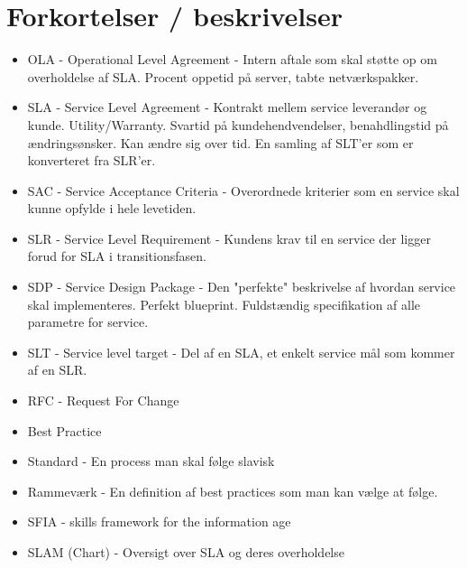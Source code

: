 \section{Forkortelser / beskrivelser}
\begin{itemize}
\item OLA - Operational Level Agreement - Intern aftale som skal støtte op om overholdelse af SLA. Procent oppetid på server, tabte netværkspakker.
\item SLA - Service Level Agreement - Kontrakt mellem service leverandør og kunde. Utility/Warranty. Svartid på kundehendvendelser, benahdlingstid på ændringsønsker. Kan ændre sig over tid. En samling af SLT'er som er konverteret fra SLR'er.
\item SAC - Service Acceptance Criteria - Overordnede kriterier som en service skal kunne opfylde i hele levetiden.
\item SLR - Service Level Requirement - Kundens krav til en service der ligger forud for SLA i transitionsfasen.
\item SDP - Service Design Package - Den "perfekte" beskrivelse af hvordan service skal implementeres. Perfekt blueprint. Fuldstændig specifikation af alle parametre for service.
\item SLT - Service level target - Del af en SLA, et enkelt service mål som kommer af en SLR.
\item RFC - Request For Change
\item Best Practice
\item Standard - En process man skal følge slavisk
\item Rammeværk - En definition af best practices som man kan vælge at følge.
\item SFIA - skills framework for the information age
\item SLAM (Chart) - Oversigt over SLA og deres overholdelse
\end{itemize}





%
%


